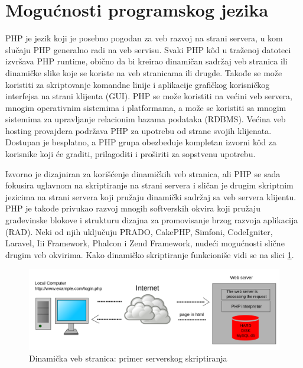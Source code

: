 \documentclass[a4paper]{article}
\begin{document}
{\section{Mogućnosti programskog jezika}
PHP je jezik koji je posebno pogodan za veb razvoj na strani servera, u kom slučaju PHP generalno radi na veb servisu. Svaki PHP k\^{o}d u traženoj datoteci izvršava PHP runtime\cite{php}, obično da bi kreirao dinamičan sadržaj veb stranica ili dinamičke slike koje se koriste na veb stranicama ili drugde. Takođe se može koristiti za skriptovanje komandne linije i aplikacije grafičkog korisničkog interfejsa na strani klijenta (GUI). PHP se može koristiti na većini veb servera, mnogim operativnim sistemima i platformama, a može se koristiti sa mnogim sistemima za upravljanje relacionim bazama podataka (RDBMS). Većina veb hosting provajdera podržava PHP za upotrebu od strane svojih klijenata. Dostupan je besplatno, a PHP grupa obezbeđuje kompletan izvorni k\^{o}d za korisnike koji će graditi, prilagoditi i proširiti za sopstvenu upotrebu.

Izvorno je dizajniran za korišćenje dinamičkih veb stranica, ali PHP se sada fokusira uglavnom na skriptiranje na strani servera i sličan je drugim skriptnim jezicima na strani servera koji pružaju dinamički sadržaj sa veb servera klijentu. PHP je takođe privukao razvoj mnogih softverskih okvira koji pružaju građevinske blokove i strukturu dizajna za promovisanje brzog razvoja aplikacija (RAD). Neki od njih uključuju PRADO, CakePHP, Simfoni, CodeIgniter, Laravel, Iii Framework, Phalcon i Zend Framework, nudeći mogućnosti slične drugim veb okvirima\cite{PHPtheGoodParts}. Kako dinamičko skriptiranje funkcioniše vidi se na slici \ref{fig:server}.


\begin{figure}[h!]
\begin{center}
\includegraphics[scale=0.15]{primer_serverskog_skriptiranja.png}
\end{center}
\caption{Dinamička veb stranica: primer serverskog skriptiranja}
\label{fig:server}
\end{figure}

}
\end{document}
